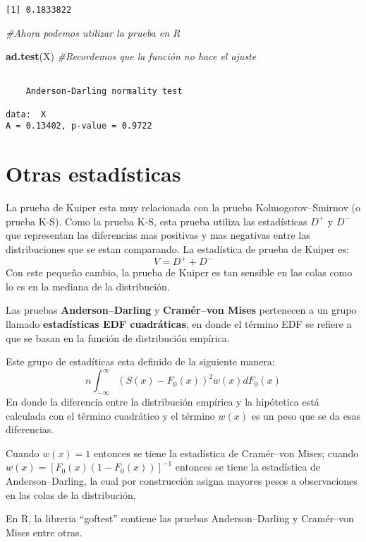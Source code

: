 \documentclass[a4paper,oneside,openany]{book}
\newenvironment{Shaded}{\begin{snugshade}}{\end{snugshade}}
\newcommand{\KeywordTok}[1]{\textcolor[rgb]{0.13,0.29,0.53}{\textbf{#1}}}
\newcommand{\CommentTok}[1]{\textcolor[rgb]{0.56,0.35,0.01}{\textit{#1}}}
\newcommand{\NormalTok}[1]{#1}
\begin{document}
\begin{verbatim}
[1] 0.1833822
\end{verbatim}

\begin{Shaded}
\begin{Highlighting}[]
\CommentTok{#Ahora podemos utilizar la prueba en R}

\KeywordTok{ad.test}\NormalTok{(X)   }\CommentTok{#Recordemos que la función no hace el ajuste}
\end{Highlighting}
\end{Shaded}

\begin{verbatim}

    Anderson-Darling normality test

data:  X
A = 0.13402, p-value = 0.9722
\end{verbatim}

\chapter{Otras estadísticas}\label{otras-estaduxedsticas}

La prueba de Kuiper esta muy relacionada con la prueba
Kolmogorov--Smirnov (o prueba K-S). Como la prueba K-S, esta prueba
utiliza las estadísticas \(D^+\) y \(D^-\) que representan las
diferencias mas positivas y mas negativas entre las distribuciones que
se estan comparando. La estadística de prueba de Kuiper es:
\[V=D^+ + D^-\] Con este pequeño cambio, la prueba de Kuiper es tan
sensible en las colas como lo es en la mediana de la distribución.

Las pruebas \textbf{Anderson--Darling} y \textbf{Cramér--von Mises}
pertenecen a un grupo llamado \textbf{estadísticas EDF cuadráticas}, en
donde el término EDF se refiere a que se basan en la función de
distribución empírica.

Este grupo de estadíticas esta definido de la siguiente manera:
\[n\int_{-\infty}^{\infty}(S(x)-F_0(x))^2w(x)dF_0(x)\] En donde la
diferencia entre la distribución empírica y la hipótetica está calculada
con el término cuadrático y el término \(w(x)\) es un peso que se da
esas diferencias.

Cuando \(w(x)=1\) entonces se tiene la estadística de Cramér--von Mises;
cuando \(w(x)=[F_0(x)(1-F_0(x))]^{-1}\) entonces se tiene la estadística
de Anderson--Darling, la cual por construcción asigna mayores pesos a
observaciones en las colas de la distribución.

En R, la libreria ``goftest'' contiene las pruebas Anderson--Darling y
Cramér--von Mises entre otras.
\end{document}

